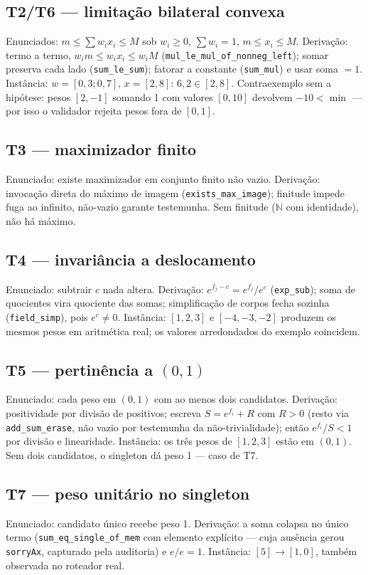 \documentclass[12pt,openany,oneside,a4paper,brazil,chapter=TITLE]{abntex2}
\begin{document}
\subsection{T2/T6 --- limitação bilateral convexa}
Enunciados: $m\leq\sum w_ix_i\leq M$ sob $w_i\geq0$, $\sum w_i=1$, $m\leq x_i\leq M$. Derivação: termo a termo, $w_im\leq w_ix_i\leq w_iM$ (\nolinkurl{mul_le_mul_of_nonneg_left}); somar preserva cada lado (\texttt{sum\_le\_sum}); fatorar a constante (\texttt{sum\_mul}) e usar soma $=1$. Instância: $w=[0{,}3;0{,}7]$, $x=[2,8]$: $6{,}2\in[2,8]$. Contraexemplo sem a hipótese: pesos $[2,-1]$ somando 1 com valores $[0,10]$ devolvem $-10<\min$ --- por isso o validador rejeita pesos fora de $[0,1]$.
\subsection{T3 --- maximizador finito}
Enunciado: existe maximizador em conjunto finito não vazio. Derivação: invocação direta do máximo de imagem (\texttt{exists\_max\_image}); finitude impede fuga ao infinito, não-vazio garante testemunha. Sem finitude ($\mathbb{N}$ com identidade), não há máximo.
\subsection{T4 --- invariância a deslocamento}
Enunciado: subtrair $c$ nada altera. Derivação: $e^{f_j-c}=e^{f_j}/e^c$ (\texttt{exp\_sub}); soma de quocientes vira quociente das somas; simplificação de corpos fecha sozinha (\texttt{field\_simp}), pois $e^c\neq0$. Instância: $[1,2,3]$ e $[-4,-3,-2]$ produzem os mesmos pesos em aritmética real; os valores arredondados do exemplo coincidem.
\subsection{T5 --- pertinência a $(0,1)$}
Enunciado: cada peso em $(0,1)$ com ao menos dois candidatos. Derivação: positividade por divisão de positivos; escreva $S=e^{f_i}+R$ com $R>0$ (resto via \texttt{add\_sum\_erase}, não vazio por testemunha da não-trivialidade); então $e^{f_i}/S<1$ por divisão e linearidade. Instância: os três pesos de $[1,2,3]$ estão em $(0,1)$. Sem dois candidatos, o singleton dá peso 1 --- caso de T7.
\subsection{T7 --- peso unitário no singleton}
Enunciado: candidato único recebe peso 1. Derivação: a soma colapsa no único termo (\texttt{sum\_eq\_single\_of\_mem} com elemento explícito --- cuja ausência gerou \texttt{sorryAx}, capturado pela auditoria) e $e/e=1$. Instância: $[5]\to[1{,}0]$, também observada no roteador real.
\end{document}
